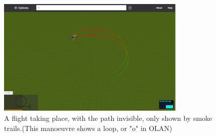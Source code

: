 \begin{figure}[h!]
    \centering
    \includegraphics[width=0.8\textwidth]{images/screen5.png}
    \caption{A flight taking place, with the path invisible, only shown by smoke trails.(This manoeuvre shows a loop, or "o" in OLAN)}
\end{figure}